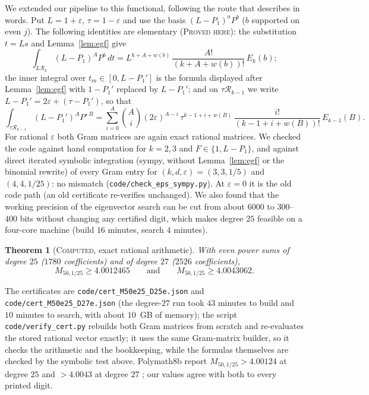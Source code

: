 \documentclass[11pt]{amsart}
\newtheorem{theorem}{Theorem}
\theoremstyle{definition}
\theoremstyle{remark}
\newcommand{\lbl}[1]{\textup{\textsc{#1}}}
\newcommand{\R}{\mathcal{R}}
\begin{document}
We extended our pipeline to this functional, following the route that
\cite[\S7.2]{Pol14b} describes in words. Put $L=1+\varepsilon$,
$\tau=1-\varepsilon$ and use the basis $(L-P_1)^aP^b$ ($b$ supported on even
$j$). The following identities are elementary (\lbl{Proved here}): the
substitution $t=Ls$ and Lemma~\ref{lem:egf} give
\[
\int_{L\R_k}(L-P_1)^AP^b\,dt=L^{k+A+w(b)}\,\frac{A!}{(k+A+w(b))!}\,E_k(b);
\]
the inner integral over $t_m\in[0,L-P_1']$ is the formula displayed after
Lemma~\ref{lem:egf} with $1-P_1'$ replaced by $L-P_1'$; and on
$\tau\R_{k-1}$ we write $L-P_1'=2\varepsilon+(\tau-P_1')$, so that
\[
\int_{\tau\R_{k-1}}(L-P_1')^AP'^{\,B}=\sum_{i=0}^{A}\binom Ai(2\varepsilon)^{A-i}\,
\tau^{k-1+i+w(B)}\,\frac{i!}{(k-1+i+w(B))!}\,E_{k-1}(B).
\]
For rational $\varepsilon$ both Gram matrices are again exact rational
matrices. We checked the code against hand computation for $k=2,3$ and
$F\in\{1,L-P_1\}$, and against direct iterated symbolic integration (sympy,
without Lemma~\ref{lem:egf} or the binomial rewrite) of every Gram entry for
$(k,d,\varepsilon)=(3,3,1/5)$ and $(4,4,1/25)$: no mismatch
(\texttt{code/check\_eps\_sympy.py}). At $\varepsilon=0$ it is the old code
path (an old certificate re-verifies unchanged). We also found that the working precision of
the eigenvector search can be cut from about $6000$ to $300$--$400$ bits
without changing any certified digit, which makes degree $25$ feasible on a
four-core machine (build $16$ minutes, search $4$ minutes).

\begin{theorem}[\lbl{Computed}, exact rational arithmetic]\label{thm:Meps}
With even power sums of degree $25$ ($1780$ coefficients) and of degree $27$
($2526$ coefficients),
\[
M_{50,1/25}\ge4.0012465\qquad\text{and}\qquad M_{50,1/25}\ge4.0043062 .
\]
\end{theorem}

The certificates are \texttt{code/cert\_M50e25\_D25e.json} and
\texttt{code/cert\_M50e25\_D27e.json} (the degree-$27$ run took $43$ minutes
to build and $10$ minutes to search, with about $10$~GB of memory); the script
\texttt{code/verify\_cert.py} rebuilds both Gram matrices from scratch and
re-evaluates the stored rational vector exactly; it uses the same
Gram-matrix builder, so it checks the arithmetic and the bookkeeping, while
the formulas themselves are checked by the symbolic test above. Polymath8b report
$M_{50,1/25}>4.00124$ at degree $25$ and $>4.0043$ at degree $27$
\cite[\S7.2]{Pol14b}; our values agree with both to every printed digit.
\end{document}
